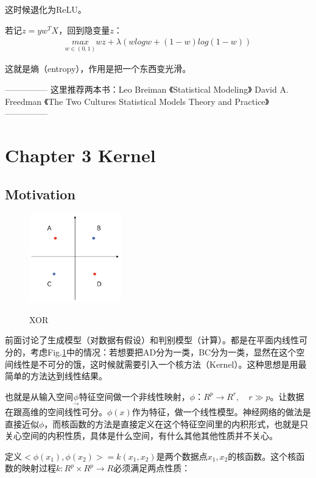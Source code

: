 \documentclass[12pt,UTF8,AutoFakeBold]{article}
\begin{document}
这时候退化为ReLU。

若记$z=yw^TX$，回到隐变量$z$：
\begin{gather}
\underset { w\in (0,1) }{ max } wz+\lambda (wlogw+(1-w)log(1-w))
\end{gather}

这就是熵（entropy），作用是把一个东西变光滑。

---------------
这里推荐两本书：Leo Breiman 《Statistical Modeling》
                David A. Freedman 《The Two Cultures Statistical Models Theory and Practice》
---------------

\section{Chapter 3  Kernel}


\subsection{Motivation}

\begin{figure}%
\includegraphics[width=4cm]{figs/XOR.png}\\
\caption{XOR}\label{fig4}
\end{figure}

前面讨论了生成模型（对数据有假设）和判别模型（计算）。都是在平面内线性可分的，考虑Fig.\ref{fig4}中的情况：若想要把AD分为一类，BC分为一类，显然在这个空间线性是不可分的饿，这时候就需要引入一个核方法（Kernel）。这种思想是用最简单的方法达到线性结果。

也就是从输入空间$\underset { \longrightarrow  }{ \phi  } $特征空间做一个非线性映射，$\phi ：{ R }^{ p }\rightarrow { R }^{ r },\quad r\gg p$。让数据在跟高维的空间线性可分。$\phi(x)$作为特征，做一个线性模型。神经网络的做法是直接近似$\phi$，而核函数的方法是直接定义在这个特征空间里的内积形式，也就是只关心空间的内积性质，具体是什么空间，有什么其他其他性质并不关心。

定义$<\phi(x_1),\phi(x_2)>=k(x_1,x_2)$是两个数据点$x_1,x_2$的核函数。这个核函数的映射过程$k:R^p \times R^p \rightarrow R$必须满足两点性质：
\end{document}
